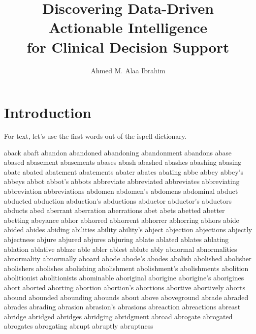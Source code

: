 \documentclass [PhD] {uclathes}
\title          {Discovering Data-Driven Actionable Intelligence\\
for Clinical Decision Support}
\author         {Ahmed M. Alaa Ibrahim}
\begin{document}
\makeintropages

%
%

\chapter{Introduction}

For text, let's use the first words out of the ispell dictionary.

aback
abaft
abandon
abandoned
abandoning
abandonment
abandons
abase
abased
abasement
abasements
abases
abash
abashed
abashes
abashing
abasing
abate
abated
abatement
abatements
abater
abates
abating
abbe
abbey
abbey's
abbeys
abbot
abbot's
abbots
abbreviate
abbreviated
abbreviates
abbreviating
abbreviation
abbreviations
abdomen
abdomen's
abdomens
abdominal
abduct
abducted
abduction
abduction's
abductions
abductor
abductor's
abductors
abducts
abed
aberrant
aberration
aberrations
abet
abets
abetted
abetter
abetting
abeyance
abhor
abhorred
abhorrent
abhorrer
abhorring
abhors
abide
abided
abides
abiding
abilities
ability
ability's
abject
abjection
abjections
abjectly
abjectness
abjure
abjured
abjures
abjuring
ablate
ablated
ablates
ablating
ablation
ablative
ablaze
able
abler
ablest
ablute
ably
abnormal
abnormalities
abnormality
abnormally
aboard
abode
abode's
abodes
abolish
abolished
abolisher
abolishers
abolishes
abolishing
abolishment
abolishment's
abolishments
abolition
abolitionist
abolitionists
abominable
aboriginal
aborigine
aborigine's
aborigines
abort
aborted
aborting
abortion
abortion's
abortions
abortive
abortively
aborts
abound
abounded
abounding
abounds
about
above
aboveground
abrade
abraded
abrades
abrading
abrasion
abrasion's
abrasions
abreaction
abreactions
abreast
abridge
abridged
abridges
abridging
abridgment
abroad
abrogate
abrogated
abrogates
abrogating
abrupt
abruptly
abruptness

\end{document}
